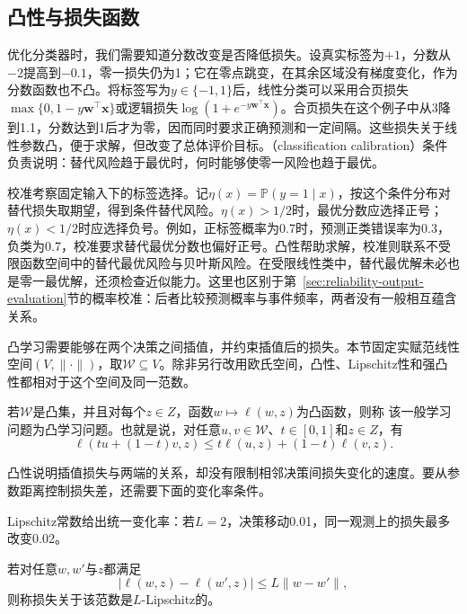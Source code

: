 \subsection{凸性与损失函数}

优化分类器时，我们需要知道分数改变是否降低损失。设真实标签为$+1$，分数从$-2$提高到$-0.1$，零一损失仍为1；它在零点跳变，在其余区域没有梯度变化，作为分数函数也不凸。将标签写为$y\in\{-1,1\}$后，线性分类可以采用合页损失$\max\{0,1-y\bm w^\top\bm x\}$或逻辑损失$\log(1+e^{-y\bm w^\top\bm x})$。合页损失在这个例子中从3降到1.1，分数达到1后才为零，因而同时要求正确预测和一定间隔。这些损失关于线性参数凸，便于求解，但改变了总体评价目标。（classification calibration）条件负责说明：替代风险趋于最优时，何时能够使零一风险也趋于最优。

校准考察固定输入下的标签选择。记$\eta(x)=\mathbb P(y=1\mid x)$，按这个条件分布对替代损失取期望，得到条件替代风险。$\eta(x)>1/2$时，最优分数应选择正号；$\eta(x)<1/2$时应选择负号。例如，正标签概率为0.7时，预测正类错误率为0.3，负类为0.7，校准要求替代最优分数也偏好正号。凸性帮助求解，校准则联系不受限函数空间中的替代最优风险与贝叶斯风险。在受限线性类中，替代最优解未必也是零一最优解，还须检查近似能力。这里也区别于第~\ref{sec:reliability-output-evaluation}节的概率校准：后者比较预测概率与事件频率，两者没有一般相互蕴含关系。

凸学习需要能够在两个决策之间插值，并约束插值后的损失。本节固定实赋范线性空间$(V,\|\cdot\|)$，取$\mathcal W\subseteq V$。除非另行改用欧氏空间，凸性、Lipschitz性和强凸性都相对于这个空间及同一范数。

\begin{definition}[凸学习问题]
\label{def:convex-learning-problem}
若$\mathcal W$是凸集，并且对每个$z\in Z$，函数$w\mapsto\ell(w,z)$为凸函数，则称
该一般学习问题为凸学习问题。也就是说，对任意$u,v\in\mathcal W$、$t\in[0,1]$和$z\in Z$，有
\[
 \ell(tu+(1-t)v,z)\leq t\ell(u,z)+(1-t)\ell(v,z).
\]
\end{definition}

凸性说明插值损失与两端的关系，却没有限制相邻决策间损失变化的速度。要从参数距离控制损失差，还需要下面的变化率条件。

Lipschitz常数给出统一变化率：若$L=2$，决策移动0.01，同一观测上的损失最多改变0.02。

\begin{definition}[Lipschitz损失]
\label{def:lipschitz-loss}
若对任意$w,w'$与$z$都满足
\begin{equation}
 |\ell(w,z)-\ell(w',z)|\leq L\|w-w'\|,
 \label{eq:lipschitz-loss}
\end{equation}
则称损失关于该范数是$L$-Lipschitz的。
\end{definition}

